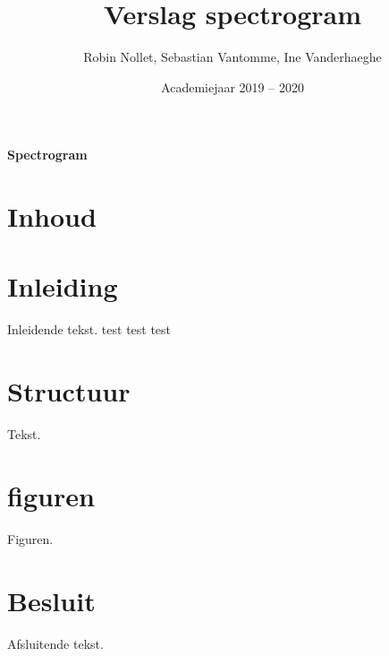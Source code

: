 \documentclass[a4paper,kul]{kulakarticle} %
\date{Academiejaar 2019 -- 2020}
\title{Verslag spectrogram}
\author{Robin Nollet, Sebastian Vantomme, Ine Vanderhaeghe}
\begin{document}
	
\maketitle
	
\begin{center}
	\centering
	\vspace*{\fill}
	\huge
	\textbf{Spectrogram}
	\vspace*{\fill}
\end{center}
	
\newpage

\section{Inhoud}
	
\tableofcontents

\newpage

\section{Inleiding}

Inleidende tekst. test test test

\section{Structuur}

Tekst.

\section{figuren}

Figuren.

\section{Besluit}

Afsluitende tekst.
\end{document}
